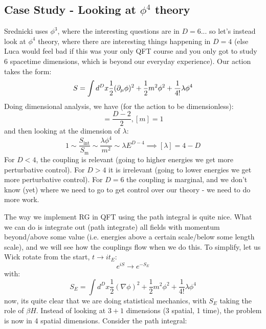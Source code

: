 \subsection{Case Study - Looking at $\phi^4$ theory}
Srednicki uses $\phi^3$, where the interesting questions are in $D = 6$... so let's instead look at $\phi^4$ theory, where there are interesting things happening in $D = 4$ (else Luca would feel bad if this was your only QFT course and you only got to study 6 spacetime dimensions, which is beyond our everyday experience). Our action takes the form:
\begin{equation}
    S = \int d^Dx \frac{1}{2}(\partial_\mu \phi)^2 + \frac{1}{2}m^2\phi^2 + \frac{1}{4!}\lambda \phi^4
\end{equation}
Doing dimensional analysis, we have (for the action to be dimensionless):
\begin{equation}
    [\phi] = \frac{D-2}{2}, [m] = 1
\end{equation}
and then looking at the dimension of $\lambda$:
\begin{equation}
    1 \sim \frac{S_{\text{int}}}{S_{\text{m}}} \sim \frac{\lambda\phi^4}{m^2} \sim \lambda E^{D-4} \implies [\lambda] = 4-D
\end{equation}
For $D < 4$, the coupling is relevant (going to higher energies we get more perturbative control). For $D > 4$ it is irrelevant (going to lower energies we get more perturbative control). For $D = 6$ the coupling is marginal, and we don't know (yet) where we need to go to get control over our theory - we need to do more work.

The way we implement RG in QFT using the path integral is quite nice. What we can do is integrate out (path integrate) all fields with momentum beyond/above some value (i.e. energies above a certain scale/below some length scale), and we will see how the couplings flow when we do this. To simplify, let us Wick rotate from the start, $t \to it_E$:
\begin{equation}
    e^{iS} \to e^{-S_E}
\end{equation}
with:
\begin{equation}
    S_E = \int d^Dx \frac{1}{2}(\nabla \phi)^2 + \frac{1}{2}m^2 \phi^2 + \frac{1}{4!}\lambda\phi^4
\end{equation}
now, its quite clear that we are doing statistical mechanics, with $S_E$ taking the role of $\beta H$. Instead of looking at $3+1$ dimensions (3 spatial, 1 time), the problem is now in 4 spatial dimensions. Consider the path integral:

